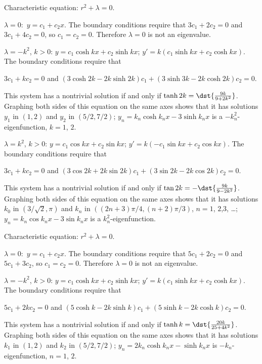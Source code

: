 \documentclass[dvips]{book}
\renewcommand{\exer}[1]{\par\medskip\;\noindent{\color{red}\bf #1.}}
\numberwithin{example}{section}
\numberwithin{equation}{section}
\numberwithin{theorem}{section}
\numberwithin{table}{section}
\numberwithin{figure}{section}
\begin{document}
\exer{13.2.18}
Characteristic equation: $r^{2}+\lambda=0$.

$\lambda=0:$
$y=c_{1}+c_{2}x$. The  boundary conditions require that $3c_{1}+2c_{2}=0$
and
$3c_{1}+4c_{2}=0$, so $c_{1}=c_{2}=0$.
Therefore  $\lambda=0$
is not an eigenvalue.


$\lambda=-k^{2}$, $k>0$:
 $y=c_{1}\cosh kx+c_{2}\sinh kx$;  $y'=k(c_{1}\sinh kx+c_{2}\cosh
kx)$.  The boundary conditions require that        \\
\centerline{$3c_{1}+kc_{2}=0$ \; and  \;
$(3\cosh 2k-2k\sinh 2k)c_{1}+(3\sinh 3k-2k\cosh 2k)c_{2}=0$.}
\noindent
This system has a nontrivial solution if and only if
 $\tanh 2k =\dst{\frac{9k}{9+2k^{2}}}$.
 Graphing
both sides of this equation on the same axes shows that it has solutions
$y_{1}$ in $(1,2)$ and $y_{2}$ in $(5/2,7/2)$;
$y_{n}=k_{n}\cosh k_{n}x-3\sinh k_{n}x$ is   a
  $-k_{n}^{2}$-eigenfunction, $k=1$, $2$.



$\lambda=k^{2}$, $k>0$:
 $y=c_{1}\cos kx+c_{2}\sin kx$; $y'=k(-c_{1}\sin kx+c_{2}\cos
kx)$.  The boundary conditions require that \\
\centerline{$3c_{1}+kc_{2}=0$ \; and \;
$(3\cos 2k+2k\sin 2k)c_{1}+(3\sin 2k-2k\cos 2k)c_{2}=0$.}
\noindent
This system has  a   nontrivial solution if and only if
 $\tan 2k =-\dst{\frac{9k}{9-2k^{2}}}$.
 Graphing
both sides of this equation on the same axes shows that it has
 solutions $k_{0}$ in $(3/\sqrt{2},\pi)$ and
$k_{n}$ in $((2n+3)\pi/4,(n+2)\pi/3)$,
$n=1$, $2$,$3$, \dots;
$y_{n}=k_{n} \cos k_{n}x-3\sin k_{n}x$ is a $k_{n}^{2}$-eigenfunction.





\exer{13.2.20}
Characteristic equation: $r^{2}+\lambda=0$.

$\lambda=0:$
 $y=c_{1}+c_{2}x$. The  boundary conditions require that
$5c_{1}+2c_{2}=0$   and
$5c_1+3c_{2}$, so $c_{1}=c_{2}=0$.
Therefore $\lambda=0$ is not an eigenvalue.



$\lambda=-k^{2}$, $k>0$:
 $y=c_{1}\cosh kx+c_{2}\sinh kx$; $y'=k(c_{1}\sinh kx+c_{2}\cosh
kx)$.  The boundary conditions require that       \\
\centerline{$5c_{1}+2kc_{2}=0$ \; and \;
$(5\cosh k-2k\sinh k)c_{1}+(5\sinh k-2k\cosh k)c_{2}=0$.}
\noindent
This system has a nontrivial solution if and only if
 $\tanh k =\dst{\frac{20k}{25+4k^{2}}}$.
 Graphing
both sides of this equation on the same axes shows that it has
solutions
$k_{1}$ in $(1,2)$ and $k_{2}$ in $(5/2,7/2)$;
$y_{n}=2k_{n}\cosh k_{n}x-\sinh k_{n}x$ is
  $-k_{n}$-eigenfunction, $n=1$, $2$.
\end{document}
